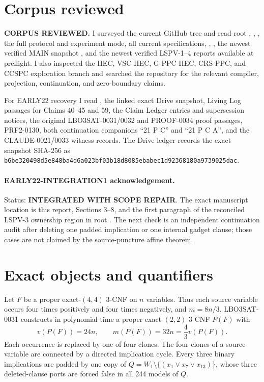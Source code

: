 \documentclass[11pt]{article}
\begin{document}
\section{Corpus reviewed}

\textbf{CORPUS REVIEWED.}
I surveyed the current GitHub tree and read root ,
, , the full
 protocol and experiment mode,
all current  specifications, ,
, the newest verified MAIN snapshot
, and the newest
verified LSPV-1--4 reports available at preflight.  I also inspected the HEC,
VSC-HEC, G-PPC-HEC, CRS-PPC, and CCSPC exploration branch and searched the
repository for the relevant compiler, projection, continuation, and
zero-boundary claims.

For EARLY22 recovery I read
, the
linked exact Drive snapshot, Living Log passages for Claims 40--45 and 59,
the Claim Ledger entries and supersession notices, the original
LBO3SAT-0031/0032 and PROOF-0034 proof passages, PRF2-0130, both continuation
companions ``21 P C'' and ``21 P C A'', and the CLAUDE-0021/0033 witness
records.  The Drive ledger records the exact snapshot SHA-256 as
\texttt{b6be320498d5e848ba4d6a023bf03b18d8085ebabec1d92368180a9739025dac}.

\paragraph{EARLY22-INTEGRATION1 acknowledgement.}
Status: \textbf{INTEGRATED WITH SCOPE REPAIR}.  The exact manuscript location
is this report, Sections 3--8, and the first paragraph of the reconciled
LSPV-3 ownership region in root .  The next check is an
independent continuation audit after deleting one padded implication or one
internal gadget clause; those cases are not claimed by the source-puncture
affine theorem.

\section{Exact objects and quantifiers}

Let $F$ be a proper exact-$(4,4)$ 3-CNF on $n$ variables.  Thus each source
variable occurs four times positively and four times negatively, and
$m=8n/3$.  LBO3SAT-0031 constructs in polynomial time a proper
exact-$(2,2)$ 3-CNF $P(F)$ with
\[
  v(P(F))=24n,\qquad m(P(F))=32n=\frac43v(P(F)).
\]
Each occurrence is replaced by one of four clones.  The four clones of a
source variable are connected by a directed implication cycle.  Every three
binary implications are padded by one copy of
$Q=W_1\setminus\{(x_1\vee x_7\vee x_{13})\}$, whose three deleted-clause
ports are forced false in all 244 models of $Q$.
\end{document}
